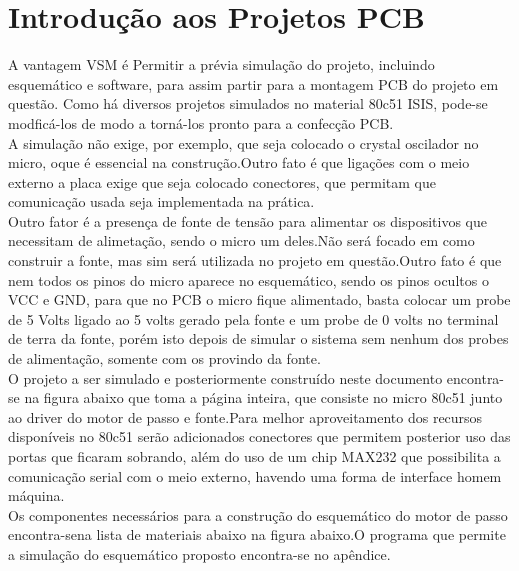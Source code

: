 \documentclass{Fabiano_file}
\begin{document}
{\section{Introdução aos Projetos PCB}
A vantagem VSM é Permitir a  prévia simulação do projeto, incluindo esquemático e software, para assim partir para a montagem PCB do projeto em questão.
Como há diversos projetos simulados no material 80c51 ISIS, pode-se modficá-los de modo a torná-los pronto para a confecção PCB.\\
A simulação não exige, por exemplo, que seja colocado o crystal oscilador no micro, oque é essencial na construção.Outro fato é que ligações com o meio externo
a placa exige que seja colocado conectores, que permitam que comunicação usada seja implementada na prática.\\
Outro fator é a presença de fonte de tensão para alimentar os dispositivos que necessitam de alimetação, sendo o micro um deles.Não será focado em como 
construir a fonte, mas sim será utilizada no projeto em questão.Outro fato é que nem todos os pinos do micro aparece no esquemático, sendo os pinos ocultos o
VCC e GND, para que no PCB o micro fique alimentado, basta colocar um probe de 5 Volts ligado ao 5 volts gerado pela fonte e um probe de 0 volts no terminal de terra
da fonte, porém isto depois de simular o sistema sem nenhum dos probes de alimentação, somente com os provindo da fonte.\\
O projeto a ser simulado e posteriormente construído neste documento encontra-se na figura abaixo que toma a página inteira, que consiste no micro 80c51 junto ao driver do motor 
de passo e fonte.Para melhor aproveitamento dos recursos disponíveis no 80c51 serão adicionados conectores que permitem posterior uso das portas que ficaram
sobrando, além do uso de um chip MAX232 que possibilita a comunicação serial com o meio externo, havendo uma forma de interface homem máquina.\\
Os componentes necessários para a construção do esquemático do motor de passo encontra-sena lista de materiais abaixo na figura abaixo.O programa que permite a
simulação do esquemático proposto encontra-se no apêndice.

}
\end{document}
